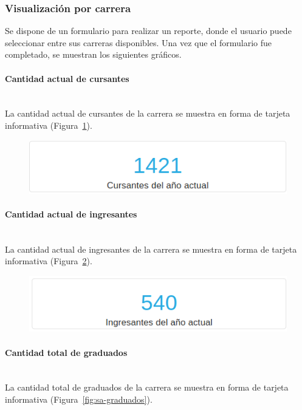 \subsubsection{Visualización por carrera}

Se dispone de un formulario para realizar un reporte, donde el usuario puede seleccionar entre sus carreras disponibles. Una vez que el formulario fue completado, se muestran los siguientes gráficos.

\paragraph{Cantidad actual de cursantes} \mbox{}\\
La cantidad actual de cursantes de la carrera se muestra en forma de tarjeta informativa (Figura~\ref{fig:sa-cursantes}). 

\begin{figure}[H]
  \centering
    \includegraphics[scale=0.4]{images/seguimiento-academico/sa-cursantes.png}
  \label{fig:sa-cursantes}
\end{figure}

\paragraph{Cantidad actual de ingresantes} \mbox{}\\
La cantidad actual de ingresantes de la carrera se muestra en forma de tarjeta informativa (Figura~\ref{fig:sa-ingresantes}).

\begin{figure}[H]
  \centering
    \includegraphics[scale=0.4]{images/seguimiento-academico/sa-ingresantes.png}
  \label{fig:sa-ingresantes}
\end{figure}

\paragraph{Cantidad total de graduados} \mbox{}\\
La cantidad total de graduados de la carrera se muestra en forma de tarjeta informativa (Figura~\ref{fig:sa-graduados}).

